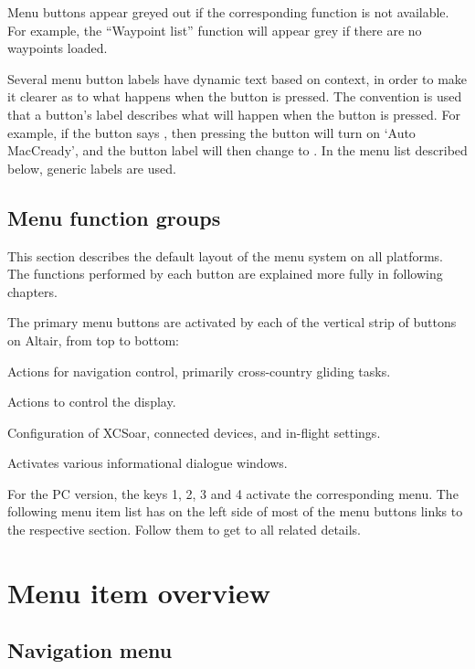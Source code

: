 Menu buttons appear greyed out if the corresponding function is not available. 
For example, the ``Waypoint list'' function will appear grey if there are no waypoints loaded.

Several menu button labels have dynamic text based on context, in
order to make it clearer as to what happens when the button is
pressed.  The convention is used that a button's label describes what
will happen when the button is pressed.  For example, if the button
says , then pressing the button will turn on `Auto
MacCready', and the button label will then change to . 
In the menu list described below, generic labels are used.

\subsection*{Menu function groups}
This section describes the default layout of the menu system on all
platforms.  The functions performed by each button are explained more
fully in following chapters.

The primary menu buttons are activated by each of the vertical strip of buttons
on Altair, from top to bottom:
\begin{jspecs}
\item[\bmenu{Nav}] Actions for navigation control, primarily cross-country
gliding tasks.
\item[\bmenu{Display}] Actions to control the display.
\item[\bmenu{Config}] Configuration of XCSoar, connected devices, and in-flight
settings.
\item[\bmenu{Info}] Activates various informational dialogue windows.
\end{jspecs}

For the PC version, the keys 1, 2, 3 and 4 activate the 
corresponding menu.  The following menu item list has on the left side of most 
of the menu buttons links to the respective section. Follow them to get to all 
related details.

\section{Menu item overview}

\subsection*{Navigation menu}
\noindent{}

